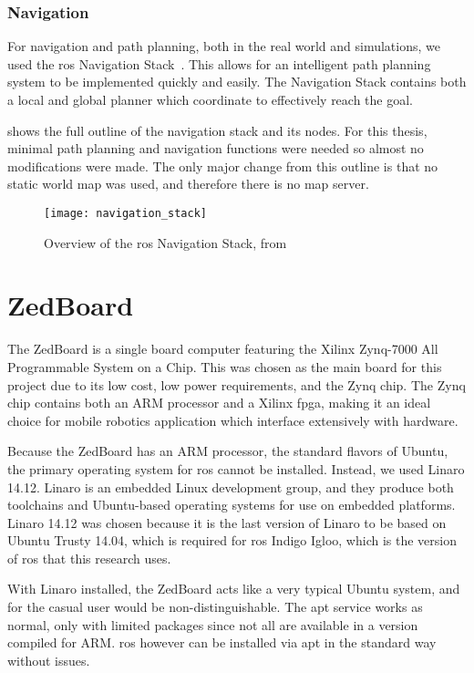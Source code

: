 \documentclass[thesis.tex]{subfile}
\begin{document}
\subsubsection{Navigation}
For navigation and path planning, both in the real world and simulations, we used the \gls{ros} Navigation Stack~\cite{ros_navigation}. This allows for an intelligent path planning system to be implemented quickly and easily. The Navigation Stack contains both a local and global planner which coordinate to effectively reach the goal. 

 shows the full outline of the navigation stack and its nodes. For this thesis, minimal path planning and navigation functions were needed so almost no modifications were made. The only major change from this outline is that no static world map was used, and therefore there is no map server.

\begin{figure}[htbp]
\texttt{[image: navigation\_stack]}
\caption[Overview of the \gls{ros} Navigation Stack]{Overview of the \gls{ros} Navigation Stack, from~\cite{NavigationStack}}
\label{fig:navigation_stack}
\end{figure}

\section{ZedBoard}
The ZedBoard is a single board computer featuring the Xilinx Zynq-7000 All Programmable System on a Chip. This was chosen as the main board for this project due to its low cost, low power requirements, and the Zynq chip. The Zynq chip contains both an ARM processor and a Xilinx \gls{fpga}, making it an ideal choice for mobile robotics application which interface extensively with hardware.
 
Because the ZedBoard has an ARM processor, the standard flavors of Ubuntu, the primary operating system for \gls{ros} cannot be installed. Instead, we used Linaro 14.12. Linaro is an embedded Linux development group, and they produce both toolchains and Ubuntu-based operating systems for use on embedded platforms. Linaro 14.12 was chosen because it is the last version of Linaro to be based on Ubuntu Trusty 14.04, which is required for \gls{ros} Indigo Igloo, which is the version of \gls{ros} that this research uses.

With Linaro installed, the ZedBoard acts like a very typical Ubuntu system, and for the casual user would be non-distinguishable. The apt service works as normal, only with limited packages since not all are available in a version compiled for ARM. \gls{ros} however can be installed via apt in the standard way without issues.

\end{document}
